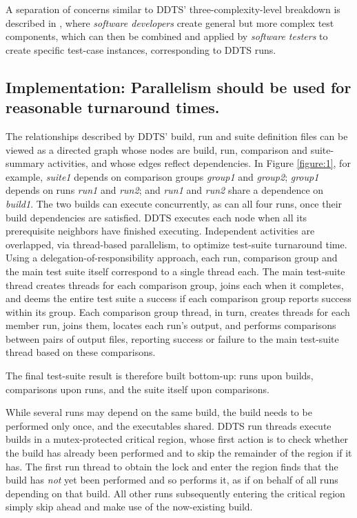 \documentclass[conference]{IEEEtran}
\begin{document}
A separation of concerns similar to DDTS' three-complexity-level breakdown is described in \cite{rest}, where \emph{software developers} create general but more complex test components, which can then be combined and applied by \emph{software testers} to create specific test-case instances, corresponding to DDTS runs.

\subsection{Implementation: Parallelism should be used for reasonable turnaround times.}

The relationships described by DDTS' build, run and suite definition files can be viewed as a directed graph whose nodes are build, run, comparison and suite-summary activities, and whose edges reflect dependencies. In Figure \ref{figure:1}, for example, \emph{suite1} depends on comparison groups \emph{group1} and \emph{group2}; \emph{group1} depends on runs \emph{run1} and \emph{run2}; and \emph{run1} and \emph{run2} share a dependence on \emph{build1}. The two builds can execute concurrently, as can all four runs, once their build dependencies are satisfied. DDTS executes each node when all its prerequisite neighbors have finished executing. Independent activities are overlapped, via thread-based parallelism, to optimize test-suite turnaround time. Using a delegation-of-responsibility approach, each run, comparison group and the main test suite itself correspond to a single thread each. The main test-suite thread creates threads for each comparison group, joins each when it completes, and deems the entire test suite a success if each comparison group reports success within its group. Each comparison group thread, in turn, creates threads for each member run, joins them, locates each run's output, and performs comparisons between pairs of output files, reporting success or failure to the main test-suite thread based on these comparisons.

The final test-suite result is therefore built bottom-up: runs upon builds, comparisons upon runs, and the suite itself upon comparisons.

While several runs may depend on the same build, the build needs to be performed only once, and the executables shared. DDTS run threads execute builds in a mutex-protected critical region, whose first action is to check whether the build has already been performed and to skip the remainder of the region if it has. The first run thread to obtain the lock and enter the region finds that the build has \emph{not} yet been performed and so performs it, as if on behalf of all runs depending on that build. All other runs subsequently entering the critical region simply skip ahead and make use of the now-existing build.
\end{document}
